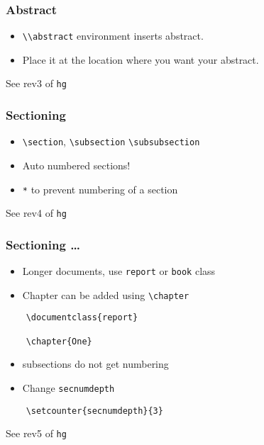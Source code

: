 \documentclass{beamer}
\newcommand{\typ}[1]{\lstinline{#1}}
\begin{document}
\begin{frame}[fragile]
  \frametitle{Abstract}
  \begin{itemize}
  \item \typ{\\abstract} environment inserts abstract.
  \item Place it at the location where you want your abstract. 
  \end{itemize}
  \tiny See rev3 of \typ{hg}
\end{frame}

\begin{frame}[fragile]
  \frametitle{Sectioning}
  \begin{itemize}
  \item \lstinline{\section}, \lstinline{\subsection}
    \lstinline{\subsubsection}
  \item Auto numbered sections!
  \item \typ{*} to prevent numbering of a section
  \end{itemize}
  \tiny See rev4 of \typ{hg}
\end{frame}

\begin{frame}[fragile]
  \frametitle{Sectioning \ldots}
  \begin{itemize}
  \item Longer documents, use \lstinline{report} or \lstinline{book}
    class
  \item Chapter can be added using \lstinline{\chapter}
  \end{itemize}
  \begin{lstlisting}
    \documentclass{report}

    \chapter{One}
  \end{lstlisting}
  \begin{itemize}
  \item subsections do not get numbering
  \item Change \lstinline{secnumdepth}
  \end{itemize}
  \begin{lstlisting}
    \setcounter{secnumdepth}{3}
  \end{lstlisting}
   \tiny See rev5 of \typ{hg}
\end{frame}
\end{document}
